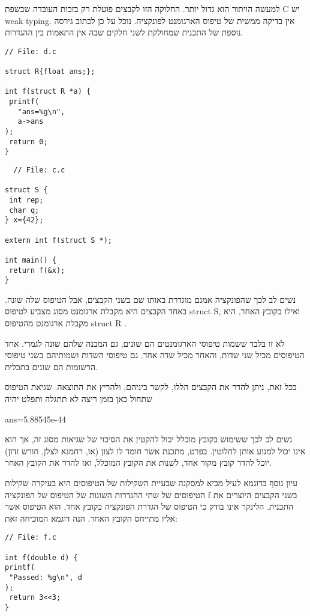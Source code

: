       למעשה הויתור הוא גדול יותר. החלוקה הזו לקבצים פועלת רק בזכות העובדה שבשפת C יש weak typing. אין בדיקה ממשית של טיפוס הארגומנט לפונקציה. נוכל על כן לכתוב גירסה נוספת של התכנית שמחולקת לשני חלקים שבה אין התאמות בין ההגדרות.

\begin{verbatim}
// File: d.c

struct R{float ans;};

int f(struct R *a) {
 printf(
   "ans=%g\n",
   a->ans
);
 return 0;
}
\end{verbatim}

\begin{verbatim}
  // File: c.c

struct S {
 int rep;
 char q;
} x={42};

extern int f(struct S *);

int main() {
 return f(&x);
}
\end{verbatim}

      נשים לב לכך שהפונקציה אמנם מוגדרת באותו שם בשני הקבצים, אבל הטיפוס שלה שונה.
      באחד הקבצים היא מקבלת ארגומנט מסוג מצביע לטיפוס struct S, ואילו בקובץ האחר, היא
      מקבלת ארגומנט מהטיפוס struct R .

      לא זו בלבד ששמות טיפוסי הארגומנטים הם שונים, גם המבנה שלהם שונה לגמרי. אחד
      הטיפוסים מכיל שני שדות, והאחר מכיל שדה אחד. גם טיפוסי השדות ושמותיהם בשני
      טיפוסי הרשומות הם שונים בתכלית.

      בכל זאת, ניתן להדר את הקבצים הללו, לקשר ביניהם, ולהריץ את התוצאה. שגיאת הטיפוס
      שתחול כאן בזמן ריצה לא תתגלה ותפלט יהיה

      ans=5.88545e-44

      נשים לכ לכך ששימוש בקובץ מוכלל יכול להקטין את הסיכוי של שגיאות מסוג זה, אך הוא
      אינו יכול למנוע אותן לחלוטין. בפרט, מתכנת אשר חומד לו לצון (או, רחמנא לצלן,
      חורש זדון) יוכל להדר קובץ מקור אחד, לשנות את הקובץ המוכלל, ואז להדר את הקובץ
      האחר.

      עיון נוסף בדוגמא לעיל מביא למסקנה שבעיית השקילות של הטיפוסים היא בעיקרה שקילות
      הטיפוסים של שתי ההגדרות השונות של הטיפוס של הפונקציה f בשני הקבצים היוצרים את
      התכנית. הלינקר אינו בודק כי הטיפוס של הגדרת הפונקציה בקובץ אחד, הוא הטיפוס אשר
      אליו מתייחס הקובץ האחר. הנה דוגמא המוכיחה זאת:

\begin{verbatim}
// File: f.c

int f(double d) {
printf(
 "Passed: %g\n", d
);
 return 3<<3;
}
\end{verbatim}

